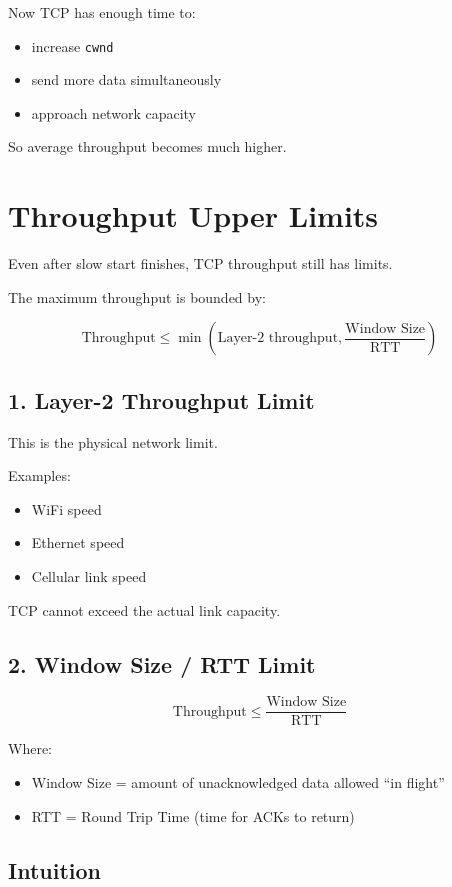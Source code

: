 Now TCP has enough time to:
\begin{itemize}
    \item increase \texttt{cwnd}
    \item send more data simultaneously
    \item approach network capacity
\end{itemize}

So average throughput becomes much higher.

\section{Throughput Upper Limits}

Even after slow start finishes, TCP throughput still has limits.

The maximum throughput is bounded by:

\[
\text{Throughput} \leq \min \left(
\text{Layer-2 throughput},
\frac{\text{Window Size}}{\text{RTT}}
\right)
\]

\subsection{1. Layer-2 Throughput Limit}

This is the physical network limit.

Examples:
\begin{itemize}
    \item WiFi speed
    \item Ethernet speed
    \item Cellular link speed
\end{itemize}

TCP cannot exceed the actual link capacity.

\subsection{2. Window Size / RTT Limit}

\[
\text{Throughput} \leq \frac{\text{Window Size}}{\text{RTT}}
\]

Where:
\begin{itemize}
    \item Window Size = amount of unacknowledged data allowed ``in flight''
    \item RTT = Round Trip Time (time for ACKs to return)
\end{itemize}

\subsection*{Intuition}

